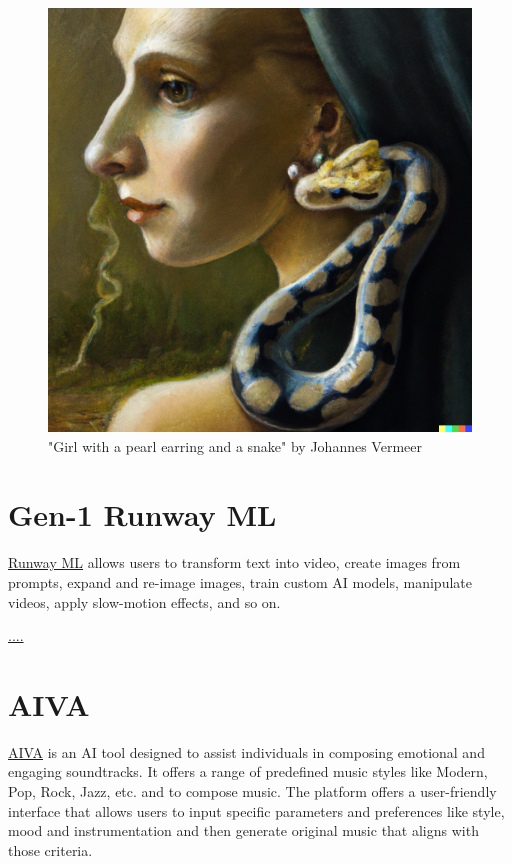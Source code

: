 \documentclass[
]{book}
\begin{document}
\begin{figure}

{\centering \includegraphics[width=0.7\linewidth]{Girl_with_a_pearlearrring_a_snake} 

}

\caption{"Girl with a pearl earring and a snake" by Johannes Vermeer}\label{fig:unnamed-chunk-15}
\end{figure}

\hypertarget{gen-1-runway-ml}{%
\section{Gen-1 Runway ML}\label{gen-1-runway-ml}}

\href{https://runwayml.com/}{Runway ML} allows users to transform text into video, create images from prompts, expand and re-image images, train custom AI models, manipulate videos, apply slow-motion effects, and so on.

\url{....}

\hypertarget{aiva}{%
\section{AIVA}\label{aiva}}

\href{https://www.aiva.ai/}{AIVA} is an AI tool designed to assist individuals in composing emotional and engaging soundtracks. It offers a range of predefined music styles like Modern, Pop, Rock, Jazz, etc. and to compose music. The platform offers a user-friendly interface that allows users to input specific parameters and preferences like style, mood and instrumentation and then generate original music that aligns with those criteria.
\end{document}
